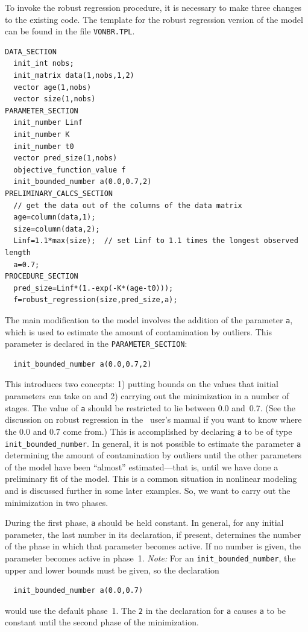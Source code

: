\documentclass{admbmanual}
\newcommand\PS{\texttt{PARAMETER\_SECTION}}
\begin{document}
To invoke the robust regression procedure, it is necessary to make three changes
to the existing code. The template for the robust regression version of the
model can be found in the file \texttt{VONBR.TPL}.
\begin{lstlisting}
DATA_SECTION
  init_int nobs;
  init_matrix data(1,nobs,1,2)
  vector age(1,nobs)
  vector size(1,nobs)
PARAMETER_SECTION
  init_number Linf
  init_number K
  init_number t0
  vector pred_size(1,nobs)
  objective_function_value f
  init_bounded_number a(0.0,0.7,2)
PRELIMINARY_CALCS_SECTION
  // get the data out of the columns of the data matrix
  age=column(data,1);
  size=column(data,2);
  Linf=1.1*max(size);  // set Linf to 1.1 times the longest observed length
  a=0.7;
PROCEDURE_SECTION
  pred_size=Linf*(1.-exp(-K*(age-t0)));
  f=robust_regression(size,pred_size,a);
\end{lstlisting}
The main modification to the model involves the addition of the parameter
\texttt{a}, which is used to estimate the amount of contamination by outliers.
This parameter is declared in the
\PS:
\begin{lstlisting}
  init_bounded_number a(0.0,0.7,2)
\end{lstlisting}
This introduces two concepts: 1) putting bounds on the values that initial
parameters can take on and 2) carrying out the minimization in a number of
stages. The value of \texttt{a} should be restricted to lie between 0.0 and~0.7.
(See the discussion on robust regression in the \scAD\ user's manual if you want
to know where the 0.0 and 0.7 come from.) This is accomplished by declaring
\texttt{a} to be of type \texttt{init\_bounded\_number}.
In general, it is not possible to estimate the parameter \texttt{a} determining
the amount of contamination by outliers until the other parameters of the model
have been ``almost'' estimated---that is, until we have done a preliminary fit
of the model. This is a common situation in nonlinear modeling and is discussed
further in some later examples. So, we want to carry out the minimization in two
phases.

During the first phase, \texttt{a} should be held constant. In general, for any
initial parameter, the last number in its declaration, if present, determines
the number of the phase in which that parameter becomes active. If no number is
given, the parameter becomes active in phase~1. \textit{Note:} For an
\texttt{init\_bounded\_number}, the upper and lower bounds must be given, so the
declaration
\begin{lstlisting}
  init_bounded_number a(0.0,0.7)
\end{lstlisting}
would use the default phase~1. The \texttt{2} in the declaration for \texttt{a}
causes \texttt{a} to be constant until the second phase of the minimization.
\end{document}
